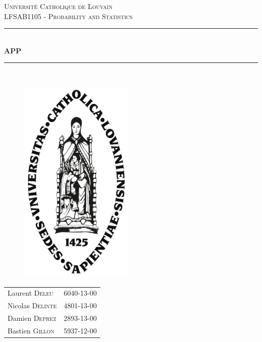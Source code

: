 \documentclass[a4paper]{article}
\begin{document}
\begin{titlepage}
\newcommand{\HRule}{\rule{\linewidth}{0.5mm}} 
\center 
\textsc{\Large Universit\'e Catholique de Louvain}\\[1cm] 
\textsc{\LARGE LFSAB1105 - Probability and Statistics}\\[0.5cm] 

\HRule \\[0.4cm]
{ \huge \bfseries APP}\\ [0.4cm]
\HRule \\[0.1cm]
\vspace{1cm}
\begin{figure}[ht]
\centering
\includegraphics [height=10cm] {img/ucl}
\end{figure}
\vspace{1cm}
\begin{minipage}{0.7\textwidth}
\begin{center}
\begin{tabular}{lc}
Laurent \textsc{Deleu} & 6040-13-00 \\
Nicolas \textsc{Delinte} & 4801-13-00\\
Damien \textsc{Deprez} & 2893-13-00 \\
Bastien \textsc{Gillon} & 5937-12-00\\

\end{tabular}
\end{center}

\end{minipage}\\[1cm]


\end{titlepage}
\end{document}
